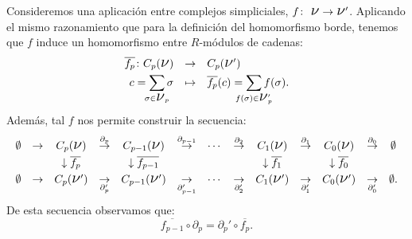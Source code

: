 \documentclass[12pt, a4paper, twoside]{book}
\numberwithin{equation}{section}
\theoremstyle{definition}
\theoremstyle{remark}
\theoremstyle{plain}
\begin{document}
	Consideremos una aplicación entre complejos simpliciales, $f\colon
	\text{
	{\Large $\nu$}}\rightarrow\text{{\Large $\nu$}}'$. Aplicando el mismo 
	razonamiento que para la definición del homomorfismo borde, tenemos 
	que $f$ induce un homomorfismo entre $R$-módulos de cadenas:
	\begin{equation}
		\label{hom:induc}
		\left.
		\begin{array}{lll}
			\overline{f_{p}}\colon C_{p}(\text{{\Large $\nu$}}) & 
				\rightarrow & C_{p}(\text{{\Large $\nu$}}')
				\\[3pt] 
			\multicolumn{1}{r}{c=\displaystyle \sum_{\mathclap{
			\sigma \in \text{{\Large $\nu$}$_{p}$}}}\sigma} & 
			\mapsto & 
			\overline{f_{p}}(c)=\displaystyle \sum_{\mathclap{
			f(\sigma) \in \text{{\Large $\nu$}$_{p}'$}}}f(\sigma).
		\end{array}
		\right. 
	\end{equation}
	Además, tal $f$ nos permite construir la secuencia:
	\begin{equation}
		\label{hom: gruphom}
		 \left.
		\begin{array}{ccccccccccccc}
			\emptyset & \rightarrow & C_{p}(
			\text{{\Large $\nu$}}) & \overset{\partial_{p}}{
			\rightarrow} & C_{p-1}(
			\text{{\Large $\nu$}}) & \overset{\partial_{p-1}}{
			\rightarrow} &\cdots & 
			\overset{\partial_{2}}{
			\rightarrow} & C_{1}(
			\text{{\Large $\nu$}})& \overset{\partial_{1}}{
			\rightarrow} & C_{0}(
			\text{{\Large $\nu$}})& \overset{\partial_{0}}{
			\rightarrow} & \emptyset\\[3pt]

			 & & \downarrow \overline{f_{p}}& & \downarrow 
			\overline{f_{p-1}}& 
			 & & & \downarrow \overline{f_{1}}
			 & & \downarrow \overline{f_{0}} & & \\ [3pt]
			\emptyset & \rightarrow & C_{p}(
			\text{{\Large $\nu$}}') &\underset{\partial_{p}'}{
			\rightarrow}  & C_{p-1}(
			\text{{\Large $\nu$}}') & \underset{\partial_{p-1}'}{
			\rightarrow}&\cdots & 
			\underset{\partial_{2}'}{
			\rightarrow} & C_{1}(
			\text{{\Large $\nu$}}')& \underset{\partial_{1}'}{
			\rightarrow} & C_{0}(
			\text{{\Large $\nu$}}')& \underset{\partial_{0}'}{
			\rightarrow} & \emptyset. \\
		\end{array}
		\right. 
	\end{equation}
	De esta secuencia observamos que: 
	\begin{equation*}
		\overline{f_{p-1}}\circ\partial_{p}=
		\partial_{p}'\circ\overline{f_{p}}. 
	\end{equation*}
\end{document}
